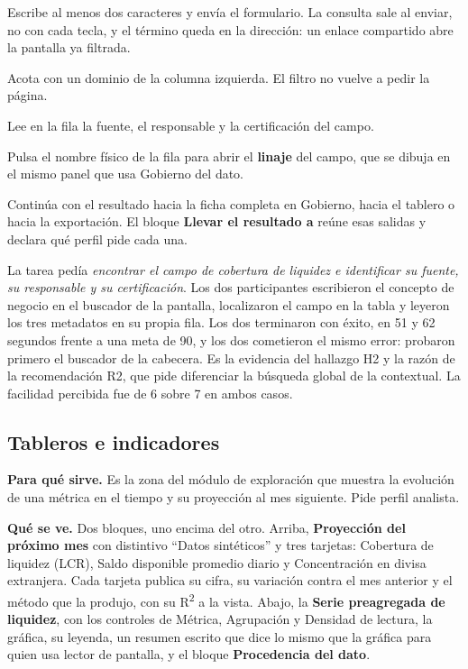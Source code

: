\begin{uxpreg}
  \item Escribe al menos dos caracteres y envía el formulario. La consulta sale al enviar, no con
    cada tecla, y el término queda en la dirección: un enlace compartido abre la pantalla ya
    filtrada.
  \item Acota con un dominio de la columna izquierda. El filtro no vuelve a pedir la página.
  \item Lee en la fila la fuente, el responsable y la certificación del campo.
  \item Pulsa el nombre físico de la fila para abrir el \textbf{linaje} del campo, que se dibuja
    en el mismo panel que usa Gobierno del dato.
  \item Continúa con el resultado hacia la ficha completa en Gobierno, hacia el tablero o hacia la
    exportación. El bloque \textbf{Llevar el resultado a} reúne esas salidas y declara qué perfil
    pide cada una.
\end{uxpreg}

\begin{uxnota}
La tarea pedía \emph{encontrar el campo de cobertura de liquidez e identificar su fuente, su
responsable y su certificación}. Los dos participantes escribieron el concepto de negocio en el
buscador de la pantalla, localizaron el campo en la tabla y leyeron los tres metadatos en su
propia fila. Los dos terminaron con éxito, en 51 y 62 segundos frente a una meta de 90, y los dos
cometieron el mismo error: probaron primero el buscador de la cabecera. Es la evidencia del
hallazgo H2 y la razón de la recomendación R2, que pide diferenciar la búsqueda global de la
contextual. La facilidad percibida fue de 6 sobre 7 en ambos casos.
\end{uxnota}

\clearpage
\subsection{Tableros e indicadores}

\textbf{Para qué sirve.} Es la zona del módulo de exploración que muestra la evolución de una
métrica en el tiempo y su proyección al mes siguiente. Pide perfil analista.

\textbf{Qué se ve.} Dos bloques, uno encima del otro. Arriba, \textbf{Proyección del próximo mes}
con distintivo \enquote{Datos sintéticos} y tres tarjetas: Cobertura de liquidez (LCR),
Saldo disponible promedio diario y Concentración en divisa extranjera. Cada tarjeta publica su
cifra, su variación contra el mes anterior y el método que la produjo, con su R\textsuperscript{2}
a la vista. Abajo, la \textbf{Serie preagregada de liquidez}, con los controles de Métrica,
Agrupación y Densidad de lectura, la gráfica, su leyenda, un resumen escrito que dice lo mismo que
la gráfica para quien usa lector de pantalla, y el bloque \textbf{Procedencia del dato}.

